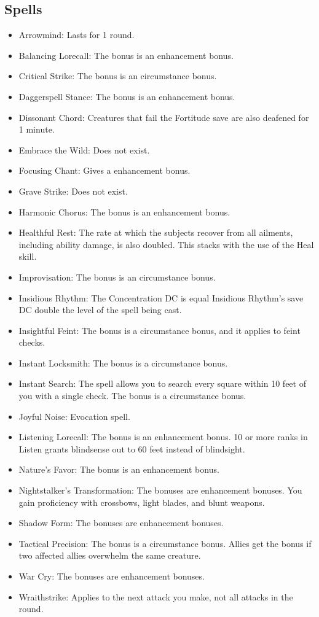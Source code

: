 \subsection{Spells}
\begin{itemize}
\item Arrowmind: Lasts for 1 round.
\item Balancing Lorecall: The bonus is an enhancement bonus.
\item Critical Strike: The bonus is an circumstance bonus.
\item Daggerspell Stance: The bonus is an enhancement bonus.
\item Dissonant Chord: Creatures that fail the Fortitude save are also deafened for 1 minute.
\item Embrace the Wild: Does not exist.
\item Focusing Chant: Gives a  enhancement bonus.
\item Grave Strike: Does not exist.
\item Harmonic Chorus: The bonus is an enhancement bonus.
\item Healthful Rest: The rate at which the subjects recover from all ailments, including ability damage, is also doubled. This stacks with the use of the Heal skill.
\item Improvisation: The bonus is an circumstance bonus.
\item Insidious Rhythm: The Concentration DC is equal Insidious Rhythm's save DC \add double the level of the spell being cast.
\item Insightful Feint: The bonus is a circumstance bonus, and it applies to feint checks.
\item Instant Locksmith: The bonus is a circumstance bonus.
\item Instant Search: The spell allows you to search every square within 10 feet of you with a single check. The bonus is a circumstance bonus.
\item Joyful Noise: Evocation spell.
\item Listening Lorecall: The bonus is an enhancement bonus. 10 or more ranks in Listen grants blindsense out to 60 feet instead of blindsight.
\item Nature's Favor: The bonus is an enhancement bonus.
\item Nightstalker's Transformation: The bonuses are enhancement bonuses. You gain proficiency with crossbows, light blades, and blunt weapons.
\item Shadow Form: The bonuses are enhancement bonuses.
\item Tactical Precision: The bonus is a circumstance bonus. Allies get the bonus if two affected allies overwhelm the same creature.
\item War Cry: The bonuses are enhancement bonuses.
\item Wraithstrike: Applies to the next attack you make, not all attacks in the round.
\end{itemize}


